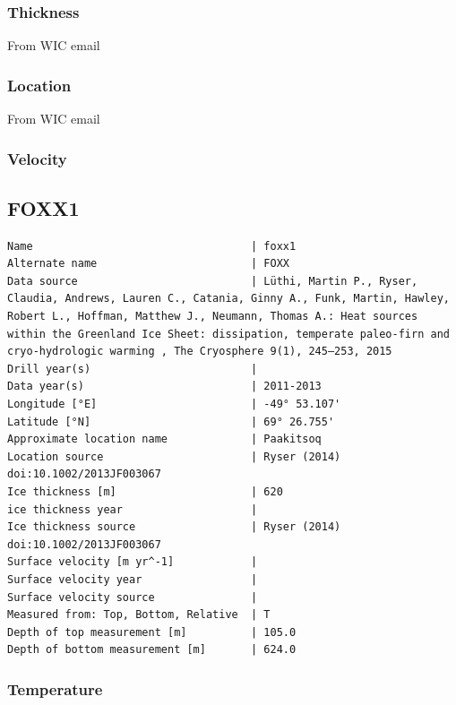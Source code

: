 \documentclass[article,a4paper,times,11pt,twoside]{article}
\begin{document}
\subsubsection{Thickness}
\label{sec:org1896306}

From WIC email

\subsubsection{Location}
\label{sec:orgcadb5b2}

From WIC email

\subsubsection{Velocity}
\label{sec:org9146a6e}
\clearpage
\subsection{FOXX1}
\label{sec:orgdf6265b}
\begin{verbatim}
Name                                  | foxx1
Alternate name                        | FOXX
Data source                           | Lüthi, Martin P., Ryser, Claudia, Andrews, Lauren C., Catania, Ginny A., Funk, Martin, Hawley, Robert L., Hoffman, Matthew J., Neumann, Thomas A.: Heat sources within the Greenland Ice Sheet: dissipation, temperate paleo-firn and cryo-hydrologic warming , The Cryosphere 9(1), 245–253, 2015 
Drill year(s)                         | 
Data year(s)                          | 2011-2013
Longitude [°E]                        | -49° 53.107'
Latitude [°N]                         | 69° 26.755'
Approximate location name             | Paakitsoq
Location source                       | Ryser (2014) doi:10.1002/2013JF003067
Ice thickness [m]                     | 620
ice thickness year                    | 
Ice thickness source                  | Ryser (2014) doi:10.1002/2013JF003067
Surface velocity [m yr^-1]            | 
Surface velocity year                 | 
Surface velocity source               | 
Measured from: Top, Bottom, Relative  | T
Depth of top measurement [m]          | 105.0
Depth of bottom measurement [m]       | 624.0
\end{verbatim}

\subsubsection{Temperature}
\label{sec:org2bca1be}
\end{document}
